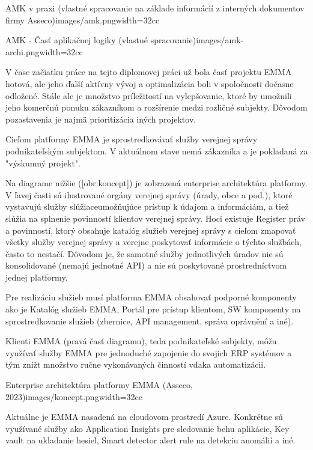 {AMK v praxi (vlastné spracovanie na základe informácií z interných dokumentov firmy Asseco)}{images/amk.png}{width=32cc}

{AMK - Časť aplikačnej logiky (vlastné spracovanie)}{images/amk-archi.png}{width=32cc}

\zlom
{}
V čase začiatku práce na tejto diplomovej práci už bola časť projektu EMMA hotová, ale  jeho ďalší aktívny vývoj a optimalizácia boli v spoločnosti dočasne odložené. Stále ale je množstvo príležitostí na vylepšovanie, ktoré by umožnili jeho komerčnú ponuku zákazníkom a rozšírenie medzi rozličné subjekty. Dôvodom pozastavenia je najmä prioritizácia iných projektov.

Cieľom platformy EMMA je sprostredkovávať služby verejnej správy podnikateľským subjektom. V aktuálnom stave nemá zákazníka a je pokladaná za "výskumný projekt".

Na diagrame nižšie ([obr:koncept]) je zobrazená enterprise architektúra platformy. V ľavej časti sú ilustrované orgány verejnej správy (úrady, obce a pod.), ktoré vystavujú služby slúžiaceumožňujúce prístup k údajom a informáciám, a tiež slúžia na splnenie povinností klientov verejnej správy. Hoci existuje Register práv a povinností, ktorý obsahuje katalóg služieb verejnej správy s cieľom zmapovať všetky služby verejnej správy a verejne poskytovať informácie o týchto službách, často to nestačí. Dôvodom je, že samotné služby jednotlivých úradov nie sú konsolidované (nemajú jednotné API) a nie sú poskytované prostredníctvom jednej platformy.

Pre realizáciu služieb musí platforma EMMA obsahovať podporné komponenty ako je Katalóg služieb EMMA, Portál pre prístup klientom, SW komponenty na sprostredkovanie služieb (zbernice, API management, správa oprávnění a iné). 

Klienti EMMA (pravá časť diagramu), teda podnikateľské subjekty, môžu využívať služby EMMA pre jednoduché zapojenie do svojich ERP systémov a tým znížt množstvo ručne vykonávaných činností vďaka automatizácii.

{Enterprise architektúra platformy EMMA  (Asseco, 2023)}{images/koncept.png}{width=32cc}

Aktuálne je EMMA nasadená na cloudovom prostredí Azure. Konkrétne sú využívané služby ako Application Insights pre sledovanie behu aplikácie, Key vault na ukladanie hesiel, Smart detector alert rule na detekciu anomálií a iné. 

